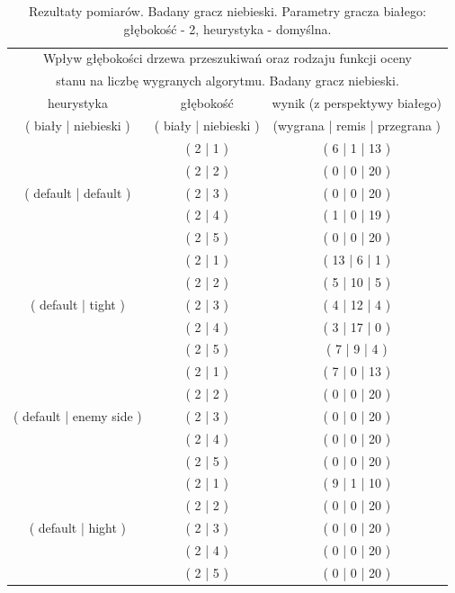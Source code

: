 \begin{table}[htbp!]
    \centering
    \begin{tabular}{ |c|c|c|}
            \hline
            \multicolumn{3}{|c|}{Wpływ głębokości drzewa przeszukiwań oraz rodzaju funkcji oceny} \\
            \multicolumn{3}{|c|}{stanu na liczbę wygranych algorytmu. Badany gracz niebieski.} \\
            \hline
            heurystyka & głębokość & wynik (z perspektywy białego) \\
            ( biały | niebieski ) & ( biały | niebieski ) & (wygrana | remis | przegrana ) \\
            \hline
            \multirow{5}{*}{( default | default )} & ( 2 | 1 ) & ( 6 | 1 | 13 ) \\
            \cline{2-3}
             & ( 2 | 2 ) & ( 0 | 0 | 20 ) \\
            \cline{2-3}
             & ( 2 | 3 ) & ( 0 | 0 | 20 ) \\
            \cline{2-3}
             & ( 2 | 4 ) & ( 1 | 0 | 19 ) \\
            \cline{2-3}
             & ( 2 | 5 ) & ( 0 | 0 | 20 ) \\
            \hline
            \multirow{5}{*}{( default | tight )} & ( 2 | 1 ) & ( 13 | 6 | 1 ) \\
            \cline{2-3}
             & ( 2 | 2 ) & ( 5 | 10 | 5 ) \\
            \cline{2-3}
             & ( 2 | 3 ) & ( 4 | 12 | 4 ) \\
            \cline{2-3}
             & ( 2 | 4 ) & ( 3 | 17 | 0 ) \\
            \cline{2-3}
             & ( 2 | 5 ) & ( 7 | 9 | 4 ) \\
            \hline
            \multirow{5}{*}{( default | enemy side )} & ( 2 | 1 ) & ( 7 | 0 | 13 ) \\
            \cline{2-3}
             & ( 2 | 2 ) & ( 0 | 0 | 20 ) \\
            \cline{2-3}
             & ( 2 | 3 ) & ( 0 | 0 | 20 ) \\
            \cline{2-3}
             & ( 2 | 4 ) & ( 0 | 0 | 20 ) \\
            \cline{2-3}
             & ( 2 | 5 ) & ( 0 | 0 | 20 ) \\
            \hline
            \multirow{5}{*}{( default | hight )} & ( 2 | 1 ) & ( 9 | 1 | 10 ) \\
            \cline{2-3}
             & ( 2 | 2 ) & ( 0 | 0 | 20 ) \\
            \cline{2-3}
             & ( 2 | 3 ) & ( 0 | 0 | 20 ) \\
            \cline{2-3}
             & ( 2 | 4 ) & ( 0 | 0 | 20 ) \\
            \cline{2-3}
             & ( 2 | 5 ) & ( 0 | 0 | 20 ) \\
            \hline
    \end{tabular}
    \caption{Rezultaty pomiarów. Badany gracz niebieski. Parametry gracza białego: głębokość - 2, heurystyka - domyślna.}
\end{table}
